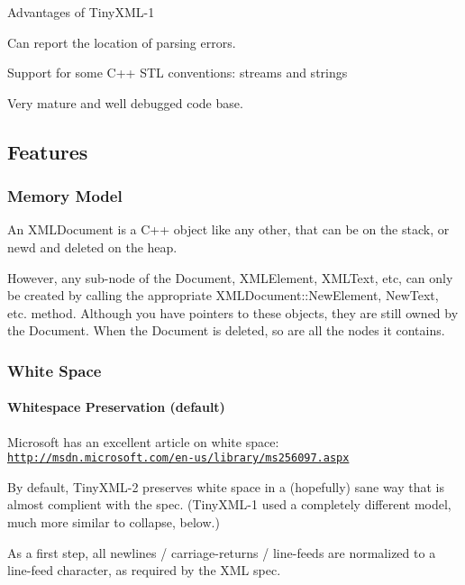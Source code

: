 Advantages of Tiny\+X\+M\+L-\/1


\begin{DoxyEnumerate}
\item Can report the location of parsing errors.
\item Support for some C++ S\+TL conventions\+: streams and strings
\item Very mature and well debugged code base.
\end{DoxyEnumerate}

\subsection*{Features }

\subsubsection*{Memory Model}

An X\+M\+L\+Document is a C++ object like any other, that can be on the stack, or new\textquotesingle{}d and deleted on the heap.

However, any sub-\/node of the Document, X\+M\+L\+Element, X\+M\+L\+Text, etc, can only be created by calling the appropriate X\+M\+L\+Document\+::\+New\+Element, New\+Text, etc. method. Although you have pointers to these objects, they are still owned by the Document. When the Document is deleted, so are all the nodes it contains.

\subsubsection*{White Space}

\paragraph*{Whitespace Preservation (default)}

Microsoft has an excellent article on white space\+: \href{http://msdn.microsoft.com/en-us/library/ms256097.aspx}{\tt http\+://msdn.\+microsoft.\+com/en-\/us/library/ms256097.\+aspx}

By default, Tiny\+X\+M\+L-\/2 preserves white space in a (hopefully) sane way that is almost complient with the spec. (Tiny\+X\+M\+L-\/1 used a completely different model, much more similar to \textquotesingle{}collapse\textquotesingle{}, below.)

As a first step, all newlines / carriage-\/returns / line-\/feeds are normalized to a line-\/feed character, as required by the X\+ML spec.

